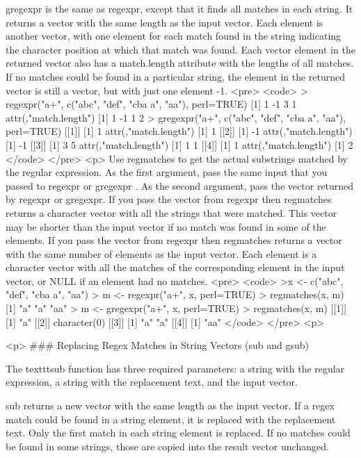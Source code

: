 gregexpr is the same as regexpr, except that it finds all matches in each string. It returns a vector with the same length as the input vector. Each element is another vector, with one element for each match found in the string indicating the character position at which that match was found. Each vector element in the returned vector also has a match.length attribute with the lengths of all matches. If no matches could be found in a particular string, the element in the returned vector is still a vector, but with just one element -1.
<pre>
<code>
> regexpr("a+", c("abc", "def", "cba a", "aa"), perl=TRUE)
[1]  1 -1  3  1
attr(,"match.length")
[1]  1 -1  1  2
> gregexpr("a+", c("abc", "def", "cba a", "aa"), perl=TRUE)
[[1]]  [1] 1    attr(,"match.length")  [1] 1
[[2]]  [1] -1   attr(,"match.length")  [1] -1
[[3]]  [1] 3 5  attr(,"match.length")  [1] 1 1
[[4]]  [1] 1    attr(,"match.length")  [1] 2
</code>
</pre>
<p>
Use regmatches to get the actual substrings matched by the regular expression. As the first argument, pass the same input that you passed to regexpr or gregexpr . As the second argument, pass the vector returned by regexpr or gregexpr. If you pass the vector from regexpr then regmatches returns a character vector with all the strings that were matched. This vector may be shorter than the input vector if no match was found in some of the elements. If you pass the vector from regexpr then regmatches returns a vector with the same number of elements as the input vector. Each element is a character vector with all the matches of the corresponding element in the input vector, or NULL if an element had no matches.
<pre>
<code>
>x <- c("abc", "def", "cba a", "aa")
> m <- regexpr("a+", x, perl=TRUE)
> regmatches(x, m)
[1]  "a"  "a"  "aa"
> m <- gregexpr("a+", x, perl=TRUE)
> regmatches(x, m)
[[1]]  [1] "a"
[[2]]  character(0)
[[3]]  [1] "a"   "a"
[[4]]  [1] "aa"
</code>
</pre>
<p>

<p>
### {Replacing Regex Matches in String Vectors (sub and gsub)}

The texttt{sub} function has three required parameters: a string with the regular expression, a string with the replacement text, and the input vector. 

sub returns a new vector with the same length as the input vector. If a regex match could be found in a string element, it is replaced with the replacement text. Only the first match in each string element is replaced. If no matches could be found in some strings, those are copied into the result vector unchanged.

